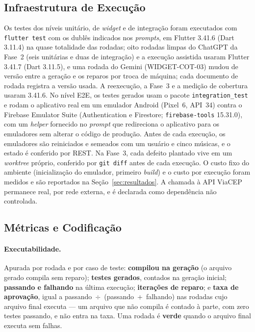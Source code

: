 \documentclass[12pt]{article}
\begin{document}
\subsection{Infraestrutura de Execução}
\label{subsec:infra}

Os testes dos níveis unitário, de \textit{widget} e de integração foram
executados com \texttt{flutter test} com os dublês indicados nos
\textit{prompts}, em Flutter 3.41.6 (Dart 3.11.4) na quase totalidade das
rodadas; oito rodadas limpas do ChatGPT da Fase~2 (seis unitárias e duas de
integração) e a execução assistida usaram Flutter 3.41.7 (Dart 3.11.5), e uma
rodada do Gemini (WIDGET-COT-03) mudou de versão entre a geração e os
reparos por troca de máquina; cada documento de rodada registra a versão
usada. A reexecução, a Fase~3 e a medição de cobertura usaram 3.41.6. No nível E2E, os testes gerados usam
o pacote \texttt{integration\_test} e rodam o aplicativo real em um emulador
Android (Pixel~6, API~34) contra o Firebase Emulator Suite (Authentication e
Firestore; \texttt{firebase-tools} 15.31.0), com um \textit{helper}
fornecido no \textit{prompt} que redireciona o aplicativo para os emuladores
sem alterar o código de produção. Antes de cada execução, os emuladores são
reiniciados e semeados com um usuário e cinco músicas, e o estado é conferido
por REST. Na Fase~3, cada defeito plantado vive em um \textit{worktree}
próprio, conferido por \texttt{git diff} antes de cada execução. O custo fixo do
ambiente (inicialização do emulador, primeiro \textit{build}) e o custo por
execução foram medidos e são reportados na Seção~\ref{sec:resultados}. A
chamada à API ViaCEP permanece real, por rede externa, e é declarada como
dependência não controlada.

\subsection{Métricas e Codificação}
\label{subsec:metricas}

\paragraph{Executabilidade.} Apurada por rodada e por caso de teste:
\textbf{compilou na geração} (o arquivo gerado compila sem reparo);
\textbf{testes gerados}, contados na geração inicial; \textbf{passando e
falhando} na última execução; \textbf{iterações de reparo}; e \textbf{taxa de
aprovação}, igual a passando~$\div$~(passando~+~falhando) nas rodadas cujo
arquivo final executa --- um arquivo que não compila é contado à parte, com
zero testes passando, e não entra na taxa. Uma rodada é \textbf{verde} quando
o arquivo final executa sem falhas.
\end{document}
